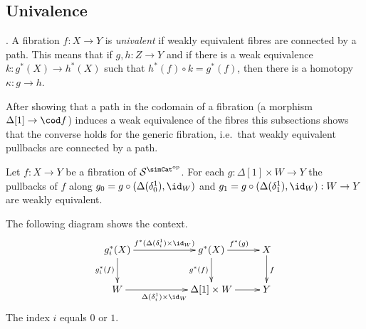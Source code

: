 \documentclass{tac}
\newcommand\cat\mathcal
\newcommand\ri{^*}
\newcommand\dual{^{\mathrm{op}}}
\newcommand\s{^{\simCat\dual}}
\newcommand\of{:}
\newcommand\simplex\Delta
\begin{document}
\subsection{Univalence}

\begin{definition}[Univalence]. A fibration $f\of X\to Y$ is \emph{univalent} if weakly equivalent fibres are connected by a path. This means that if $g,h\of Z\to Y$ and if there is a weak equivalence $k\of g\ri(X)\to h\ri(X)$ such that $h\ri(f)\circ k = g\ri(f)$, then there is a homotopy $\kappa\of g\to h$.
\end{definition}

After showing that a path in the codomain of a fibration (a morphism $\simplex[1]\to\cod f$) induces a weak equivalence of the fibres this subsections shows that the converse holds for the generic fibration, i.e.\ that weakly equivalent pullbacks are connected by a path.

\begin{lemma} Let $f\of X\to Y$ be a fibration of $\cat S\s$. For each $g\of \simplex[1]\times W\to Y$ the pullbacks of $f$ along $g_0=g\circ (\simplex(\delta^1_0),\id_W)$ and $g_1=g\circ(\simplex(\delta^1_1),\id_W)\of W\to Y$ are weakly equivalent. \end{lemma}

The following diagram shows the context.
\[\xymatrix{
 g_i\ri(X) \ar[rr]^{f\ri(\simplex(\delta^1_i)\times \id_W)} \ar[d]_{g_i\ri(f)}  && g\ri(X) \ar[r]^{f\ri(g)} \ar[d]_{g\ri(f)}  & X\ar[d]^f\\
 W \ar[rr]_{\simplex(\delta^1_i)\times \id_W} && \simplex[1]\times W \ar[r] & Y\\
}\]
The index $i$ equals $0$ or $1$. 
\end{document}
